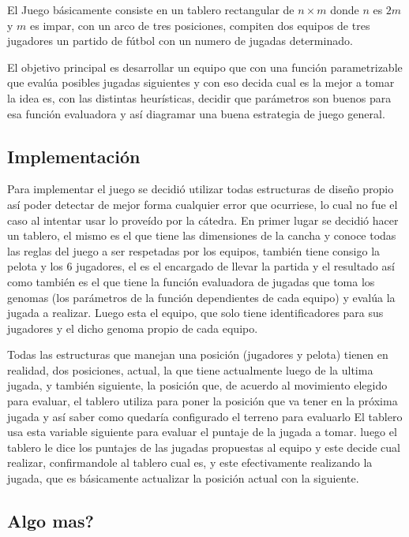 
El Juego básicamente consiste en un tablero rectangular de $n \times m$ donde
$n$ es $2m$ y $m$ es impar, con un arco de tres posiciones, compiten dos equipos
de tres jugadores un partido de fútbol con un numero de jugadas determinado.


El objetivo principal es desarrollar un equipo que con una función parametrizable
que evalúa posibles jugadas siguientes y con eso decida cual es la mejor a tomar
la idea es, con las distintas heurísticas, decidir que parámetros son buenos para esa
función evaluadora y así diagramar una buena estrategia de juego general.



\subsection{Implementación}


Para implementar el juego se decidió utilizar todas estructuras de diseño propio así poder
detectar de mejor forma cualquier error que ocurriese, lo cual no fue el caso al intentar
usar lo proveído por la cátedra.
En primer lugar se decidió hacer un tablero, el mismo es el que tiene las dimensiones de la cancha y
conoce todas las reglas del juego a ser respetadas por los equipos, también tiene consigo la pelota y los
6 jugadores, el es el encargado de llevar la partida y el resultado así como también es el que tiene la
función evaluadora de jugadas que toma los genomas (los parámetros de la función dependientes de cada equipo)
y evalúa la jugada a realizar.
Luego esta el equipo, que solo tiene identificadores para sus jugadores y el dicho genoma propio de cada equipo.


Todas las estructuras que manejan una posición (jugadores y pelota) tienen en realidad, dos posiciones, actual, la que
tiene actualmente luego de la ultima jugada, y también siguiente, la posición que, de acuerdo al
movimiento elegido para evaluar, el tablero utiliza para poner la posición que va tener en la próxima jugada y así
saber como quedaría configurado el terreno para evaluarlo
El tablero usa esta variable siguiente para evaluar el puntaje de la jugada a tomar.
luego el tablero le dice los puntajes de las jugadas propuestas al equipo y este decide cual realizar, confirmandole
al tablero cual es, y este efectivamente realizando la jugada, que es básicamente actualizar la posición actual
con la siguiente.

\subsection{Algo mas?}
